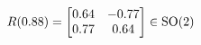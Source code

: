 \documentclass[preview]{standalone}
\begin{document}
\begin{align*}
\special{dvisvgm:raw <g id='unique000'>}R(0.88) = \begin{bmatrix} 0.64 & -0.77 \\ 0.77 & 0.64 \end{bmatrix} \in \text{SO}(2)\special{dvisvgm:raw </g>}
\end{align*}
\end{document}
